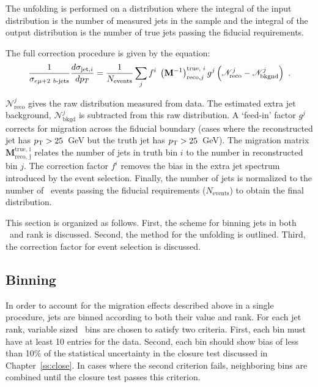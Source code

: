 The unfolding is performed on a distribution where the integral of the input distribution is the
number of measured jets in the sample and the integral of the output distribution is the number
of true jets passing the fiducial requirements. 

The full correction procedure is given by the equation:
\begin{equation}
\frac{1}{\sigma_{e\mu+2~b\textrm{-jets}}} \frac{d \sigma_{\mathrm{jet,}i}}{dp_T} = \frac{1}{N_{\textrm{events}}}\sum_j f^i \;\left ({\mathbf M}^{-1}\right )_{\textrm{reco,} j}^{\textrm{true, }i} g^j \left ({\mathscr N}^j_{\textrm {reco}}-
{\mathscr N}^j_{\textrm{bkgnd}} \right ) \ .
\label{eqn:unffinal}
\end{equation}
\noindent  

${\mathscr N}^j_{\textrm {reco}}$ gives the raw distribution measured from data. The estimated extra jet background, ${\mathscr N}^j_{\textrm{bkgd}}$ is subtracted from this raw distribution. 
A `feed-in' factor $g^j$ corrects for migration across the fiducial boundary (cases where the reconstructed jet has
$p_{\text{T}}>25$~GeV but the truth jet has $p_{\text{T}}>25$~GeV). The migration matrix ${\mathbf M}_{\textrm{reco, j}}^{\textrm{true, i}}$ 
relates the number of jets in truth bin $i$ to the number in reconstructed bin $j$. The correction factor $f^i$ 
removes the bias in the extra jet spectrum introduced by the event selection. Finally, the number of jets is normalized to the number of \emubb\ events passing the fiducial requirements ($N_{\textrm{events}}$) to obtain the final distribution.

This section is organized as follows.
First, the scheme for binning jets in both \pt\ and rank is discussed. 
Second, the method for the unfolding is outlined. Third, the correction factor for event selection is discussed.

\subsection{Binning}

In order to account for the migration effects described above in a single procedure, jets are binned according to both their \pt value and rank. 
For each jet rank, variable sized \pt\ bins are chosen to satisfy two criteria.
First, each bin must have at least 10 entries for the data. Second, each bin should show bias of less than 10\% of the statistical uncertainty in the closure test discussed in Chapter~\ref{ss:close}. In cases where the second criterion fails, neighboring bins are combined until the closure test passes this criterion. %


